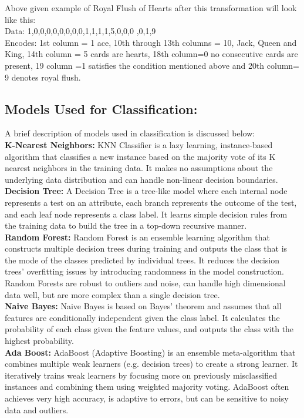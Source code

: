 \documentclass[11pt, oneside]{article}   	%
\begin{document}
Above given example of Royal Flush of Hearts after this transformation will look like this:\\
Data: 1,0,0,0,0,0,0,0,0,1,1,1,1,5,0,0,0 ,0,1,9\\
Encodes: 1st column = 1 ace, 10th through 13th columns =
10, Jack, Queen and King, 14th column = 5 cards are hearts,
18th column=0 no consecutive cards are present, 19 column =1 satisfies the condition mentioned above and 20th column= 9 denotes royal flush.

\subsection{Models Used for Classification:}
A brief description of models used in classification is discussed below:
\\
\textbf{K-Nearest Neighbors:} KNN Classifier is a lazy learning, instance-based algorithm that classifies a new instance based on the majority vote of its K nearest neighbors in the training data. It makes no assumptions about the underlying data distribution and can handle non-linear decision boundaries.\\
\textbf{Decision Tree:} A Decision Tree is a tree-like model where each internal node represents a test on an attribute, each branch represents the outcome of the test, and each leaf node represents a class label. It learns simple decision rules from the training data to build the tree in a top-down recursive manner.  
\\
\textbf{Random Forest:} Random Forest is an ensemble learning algorithm that constructs multiple decision trees during training and outputs the class that is the mode of the classes predicted by individual trees. It reduces the decision trees' overfitting issues by introducing randomness in the model construction. Random Forests are robust to outliers and noise, can handle high dimensional data well, but are more complex than a single decision tree.
\\
\textbf{Naive Bayes:} Naive Bayes is based on Bayes' theorem and assumes that all features are conditionally independent given the class label. It calculates the probability of each class given the feature values, and outputs the class with the highest probability.
\\
\textbf{Ada Boost:} AdaBoost (Adaptive Boosting) is an ensemble meta-algorithm that combines multiple weak learners (e.g. decision trees) to create a strong learner. It iteratively trains weak learners by focusing more on previously misclassified instances and combining them using weighted majority voting. AdaBoost often achieves very high accuracy, is adaptive to errors, but can be sensitive to noisy data and outliers.
\end{document}
